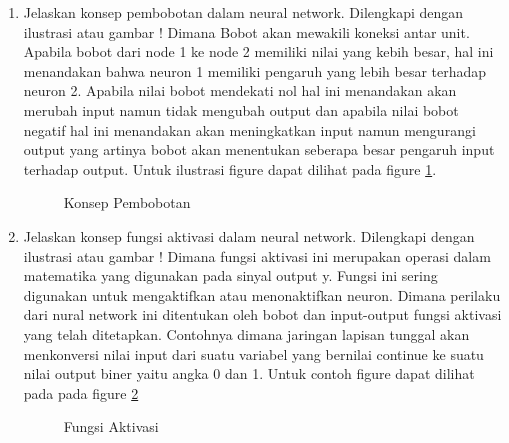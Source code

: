\begin{enumerate}
\item Jelaskan konsep pembobotan dalam neural network. Dilengkapi dengan ilustrasi atau gambar !
	\subitem Dimana Bobot akan mewakili koneksi antar unit. Apabila bobot dari node 1 ke node 2 memiliki nilai yang kebih besar, hal ini menandakan bahwa neuron 1 memiliki pengaruh yang lebih besar terhadap neuron 2. Apabila nilai bobot mendekati nol hal ini menandakan akan merubah input namun tidak mengubah output dan apabila nilai bobot negatif hal ini menandakan akan meningkatkan input namun mengurangi output yang artinya bobot akan menentukan seberapa besar pengaruh input terhadap output. Untuk ilustrasi figure dapat dilihat pada figure \ref{YNC6-2}.

	\begin{figure}[!htbp]
		\caption{Konsep Pembobotan}
		\label{YNC6-2}
	\end{figure}	

\item Jelaskan konsep fungsi aktivasi dalam neural network. Dilengkapi dengan ilustrasi atau gambar !
	\subitem Dimana fungsi aktivasi ini merupakan operasi dalam matematika yang digunakan pada sinyal output y. Fungsi ini sering digunakan untuk mengaktifkan atau menonaktifkan neuron. Dimana perilaku dari nural network ini ditentukan oleh bobot dan input-output fungsi aktivasi yang telah ditetapkan. Contohnya dimana jaringan lapisan tunggal akan menkonversi nilai input dari suatu variabel yang bernilai continue ke suatu nilai output biner yaitu angka 0 dan 1. Untuk contoh figure dapat dilihat pada pada figure \ref{YNC6-3}

	\begin{figure}[!htbp]
		\caption{Fungsi Aktivasi}
		\label{YNC6-3}
	\end{figure}	
	

\end{enumerate}
